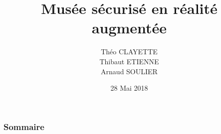 \documentclass[10pt, c]{beamer}
\title{Musée sécurisé en réalité augmentée}
\author{Théo CLAYETTE\\Thibaut ETIENNE\\Arnaud SOULIER}
\institute{Université des Sciences de Montpellier}
\date{28 Mai 2018}
\begin{document}
	\begin{frame}
	\titlepage
	\end{frame}

    \begin{frame}
        \frametitle{Sommaire}
        \tableofcontents[pausesections]
    \end{frame}

    
    
    
    
\end{document}
